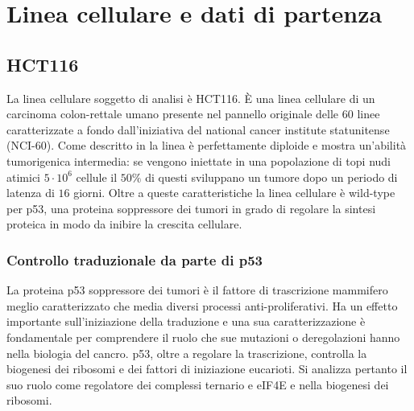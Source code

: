 \chapter{Linea cellulare e dati di partenza}
\label{cha:cell_lines}

\section{HCT116}
\label{sec:hct116}
La linea cellulare soggetto di analisi \`e HCT116.
\`E una linea cellulare di un carcinoma colon-rettale umano presente nel pannello originale delle $60$ linee caratterizzate a fondo dall'iniziativa del national cancer institute statunitense (NCI-$60$).
Come descritto in \cite{hct116} la linea \`e perfettamente diploide e mostra un'abilit\`a tumorigenica intermedia: se vengono iniettate in una popolazione di topi nudi atimici $5\cdot 10^6$ cellule il $50\%$ di questi sviluppano un tumore dopo un periodo di latenza di $16$ giorni.
Oltre a queste caratteristiche la linea cellulare \`e wild-type per p53, una proteina soppressore dei tumori in grado di regolare la sintesi proteica in modo da inibire la crescita cellulare.

  \subsection{Controllo traduzionale da parte di p53}
  \label{subsec:p53}
  La proteina p53 soppressore dei tumori \`e il fattore di trascrizione mammifero meglio caratterizzato che media diversi processi anti-proliferativi.
  Ha un effetto importante sull'iniziazione della traduzione e una sua caratterizzazione \`e fondamentale per comprendere il ruolo che sue mutazioni o deregolazioni hanno nella biologia del cancro.
  p53, oltre a regolare la trascrizione, controlla la biogenesi dei ribosomi e dei fattori di iniziazione eucarioti.
  Si analizza pertanto il suo ruolo come regolatore dei complessi ternario e eIF4E e nella biogenesi dei ribosomi.

